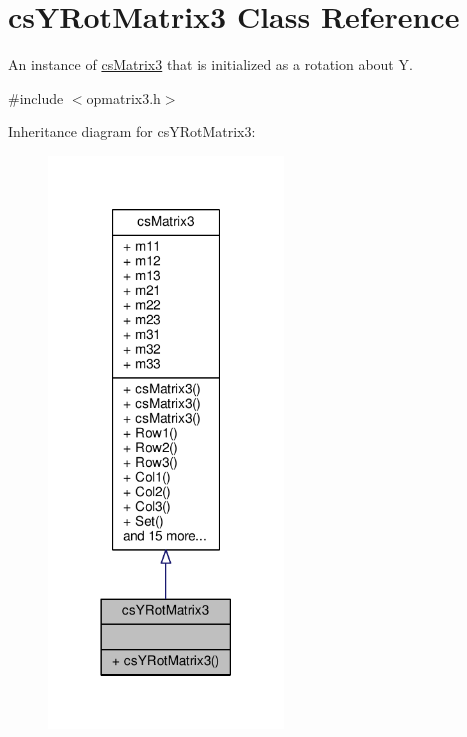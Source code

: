 \hypertarget{classcsYRotMatrix3}{}\section{cs\+Y\+Rot\+Matrix3 Class Reference}
\label{classcsYRotMatrix3}


An instance of \hyperlink{classcsMatrix3}{cs\+Matrix3} that is initialized as a rotation about Y.  




{\ttfamily \#include $<$opmatrix3.\+h$>$}



Inheritance diagram for cs\+Y\+Rot\+Matrix3\+:
\nopagebreak
\begin{figure}[H]
\begin{center}
\leavevmode
\includegraphics[width=177pt]{da/d29/classcsYRotMatrix3__inherit__graph}
\end{center}
\end{figure}


